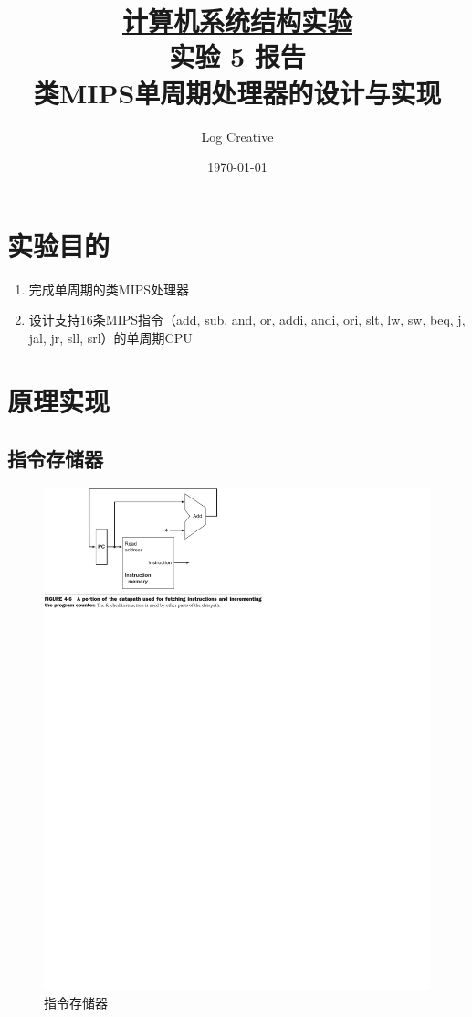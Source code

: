 \documentclass[a4paper,UTF8]{ctexart}
\begin{document}
\title{\normalsize \underline{计算机系统结构实验}\\\LARGE 实验 5 报告\\\vspace*{1em}\normalsize 类MIPS单周期处理器的设计与实现}
\author{Log Creative}
\date{\today}
\maketitle
\tableofcontents
\clearpage

\section{实验目的}

\begin{enumerate}
    \item 完成单周期的类MIPS处理器
    \item 设计支持16条MIPS指令（add, sub, and, or, addi, andi, ori, slt, lw, sw, beq, j, jal, jr, sll, srl）的单周期CPU
\end{enumerate}

\section{原理实现}

\subsection{指令存储器}

\begin{figure}[h]
    \centering
    \includegraphics[width=\textwidth]{instruction.pdf}
    \caption{指令存储器}
    \label{fig:instr}
\end{figure}
\end{document}
